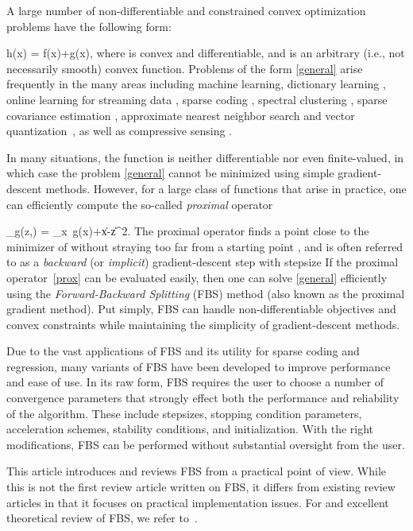 \documentclass{amsart}
\newcommand{\half}{\frac{1}{2}}
\newcommand{\eqb}[1]{}
\DeclareMathOperator*{\minimize}{minimize\quad}
\DeclareMathOperator*{\argmin}{arg\,min}
\DeclareMathOperator{\prox}{prox}
\theoremstyle{definition}
\begin{document}
A large number of non-differentiable and constrained convex optimization problems have the following form:
\eqb{general}
\minimize h(x) = f(x)+g(x),
\eqe 
where    is convex and differentiable, and  is an arbitrary (i.e., not necessarily smooth) convex function.  Problems of the form \eqref{general} arise frequently in the many areas including  machine learning, dictionary learning \cite{JMOB10}, online learning for streaming data \cite{DS09}, sparse coding \cite{KL10,SGL12}, spectral clustering \cite{HS11}, sparse covariance estimation \cite{OONR12}, approximate nearest neighbor search and vector quantization~\cite{JFF11}, as well as compressive sensing \cite{FNW07}.
  
In many situations, the function  is neither differentiable nor even finite-valued, in which case the problem \eqref{general} cannot be minimized using simple gradient-descent methods. However, for a large class of functions  that arise in practice, one can efficiently compute the so-called \emph{proximal} operator 
\eqb{prox}
\prox_g(z,\tau) = \argmin_x \,\tau g(x)+\half \|x-z\|^2.
\eqe
The proximal operator finds a point close to the minimizer of  without straying too far from a starting point , and is often referred to as a \emph{backward} (or \emph{implicit}) gradient-descent step with stepsize 
If the proximal operator~\eqref{prox} can be evaluated easily, then one can  solve \eqref{general} efficiently using the \emph{Forward-Backward Splitting} (FBS) method (also known as the proximal gradient method). Put simply, FBS can handle non-differentiable objectives and convex constraints while maintaining the simplicity of gradient-descent methods.

 Due to the vast applications of FBS and its utility for sparse coding and regression, many variants of FBS have been developed to improve performance and ease of use.  In its raw form, FBS requires the user to choose a number of convergence parameters that strongly effect both the performance and reliability of the algorithm.  These include stepsizes, stopping condition parameters, acceleration schemes, stability conditions, and initialization.   With the right modifications, FBS can be performed without substantial oversight from the user.  
 
 This article introduces  and reviews FBS from a practical point of view.  While this is not the first review article written on FBS, it differs from existing review articles in that it focuses on practical implementation issues.  For and excellent theoretical review of FBS, we refer to~\cite{CP11}.
 
\end{document}
